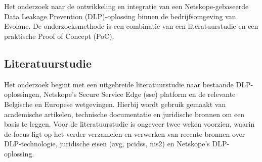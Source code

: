 
\chapter{}%
\label{ch:methodologie}


Het onderzoek naar de ontwikkeling en integratie van een Netskope-gebaseerde Data Leakage Prevention (DLP)-oplossing binnen 
de bedrijfsomgeving van Evolane. De onderzoeksmethode is een combinatie van een literatuurstudie en een praktische Proof of Concept (PoC).

\section{Literatuurstudie}%

Het onderzoek begint met een uitgebreide literatuurstudie naar bestaande DLP-oplossingen, Netskope's Secure Service Edge (\gls{sse}) platform en de relevante Belgische en Europese wetgevingen. 
Hierbij wordt gebruik gemaakt van academische artikelen, technische documentatie en juridische bronnen om een basis te leggen. 
Voor de literatuurstudie is ongeveer twee weken voorzien, waarin de focus ligt op het verder verzamelen en verwerken van recente bronnen
over DLP-technologie, juridische eisen (\gls{avg}, \gls{pcidss}, \gls{nis2}) en Netskope's DLP-oplossing.

